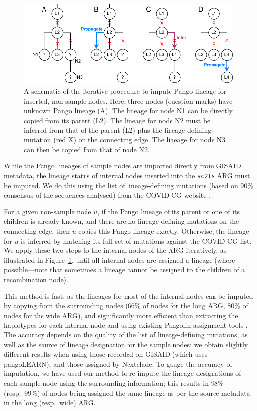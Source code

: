 \documentclass{article}
\begin{document}
\begin{figure} \centering
\includegraphics[width=.7\textwidth]{figures/imputation.pdf}
\caption{\label{fig:imputation}A schematic of the iterative procedure to impute
Pango lineage for inserted, non-sample nodes. Here, three nodes (question
marks) have unknown Pango lineage (A). The lineage for node N1 can be directly 
copied from its parent (L2). The lineage for node N2 must be inferred from 
that of the parent (L2) plus the lineage-defining mutation (red X) 
on the connecting edge. The lineage for node N3 can then be copied from 
that of node N2.}
\end{figure}
While the Pango lineages of sample nodes are imported directly from 
GISAID metadata, the lineage status of internal nodes inserted into 
the \texttt{sc2ts} ARG must be imputed. We do this using 
the list of lineage-defining mutations (based on 90\% consensus 
of the sequences analysed) from the COVID-CG website 
\citep[][\url{https://covidcg.org/}; accessed on 4 November 2022]{Chen2021-zc}.

For a given non-sample node $u$, if the Pango lineage of its parent or 
one of its children is already known, and there are no lineage-defining mutations
on the connecting edge, then $u$ copies this Pango lineage exactly.
Otherwise, the lineage for $u$ is inferred by 
matching its full set of mutations against the COVID-CG list. 
We apply these two steps to the internal nodes of the ARG iteratively,
as illustrated in Figure~\ref{fig:imputation}, until all internal nodes 
are assigned a lineage (where possible---note that sometimes a lineage cannot
be assigned to the children of a recombination node).

This method is fast, as the lineages for most of the internal nodes can be 
imputed by copying from the surrounding nodes (66\% of nodes for the long ARG, 
80\% of nodes for the wide ARG), and significantly more efficient than extracting
the haplotypes for each internal node and using existing Pangolin assignment tools 
\citep{OToole2021-assignment}. The 
accuracy depends on the quality of the list of lineage-defining mutations, 
as well as the source of lineage designation for the sample nodes: we obtain 
slightly different results when using those recorded on GISAID (which uses 
pangoLEARN), and those assigned by Nextclade. To gauge the accuracy of
imputation, we have used our method to re-impute the lineage designations of each 
sample node using the surrounding information; this results in 98\% (resp.~99\%) of 
nodes being assigned the same lineage as per the source metadata in the long 
(resp.~wide) ARG.
\end{document}
